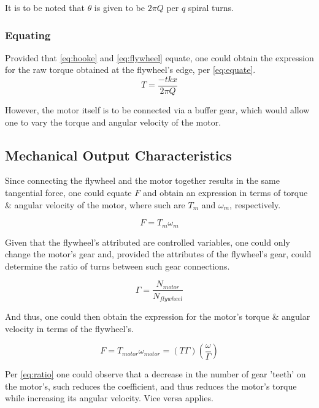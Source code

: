 \documentclass[conference]{IEEEtran}
\begin{document}
It is to be noted that \(\theta\) is given to be \(2\pi Q\) per \(q\) spiral turns.


\subsubsection{Equating}
Provided that \eqref{eq:hooke} and \eqref{eq:flywheel} equate, one could obtain the expression for the raw torque obtained at the flywheel's edge, per \eqref{eq:equate}.
\begin{equation}
    \label{eq:equate}
    T = \frac{-tkx}{2\pi Q}
\end{equation}

However, the motor itself is to be connected via a buffer gear, which would allow one to vary the torque and angular velocity of the motor.

\subsection{Mechanical Output Characteristics}
Since connecting the flywheel and the motor together results in the same tangential force, one could equate \(F\) and obtain an expression in terms of torque \& angular velocity of the motor, where such are \(T_m\) and \(\omega_m\), respectively.

\begin{equation*}
    F = T_m \omega_m
\end{equation*}

Given that the flywheel's attributed are controlled variables, one could only change the motor's gear and, provided the attributes of the flywheel's gear, could determine the ratio of turns between such gear connections.

\begin{equation*}
    \Gamma = \frac{N_{motor}}{N_{flywheel}}
\end{equation*}

And thus, one could then obtain the expression for the motor's torque \& angular velocity in terms of the flywheel's.

\begin{equation}
    \label{eq:ratio}
    F = T_{motor}\omega_{motor} = (T\Gamma)\left(\frac{\omega}{\Gamma}\right)
\end{equation}

Per \eqref{eq:ratio} one could observe that a decrease in the number of gear 'teeth' on the motor's, such reduces the coefficient, and thus reduces the motor's torque while increasing its angular velocity. Vice versa applies.
\end{document}
